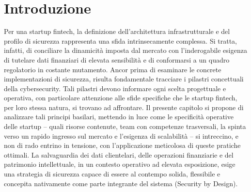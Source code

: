 \section{Introduzione}
Per una startup fintech, la definizione dell'architettura infrastrutturale e del profilo di sicurezza rappresenta una sfida intrinsecamente complessa. Si tratta, infatti, di conciliare la dinamicità imposta dal mercato con l'inderogabile esigenza di tutelare dati finanziari di elevata sensibilità e di conformarsi a un quadro regolatorio in costante mutamento. Ancor prima di esaminare le concrete implementazioni di sicurezza, risulta fondamentale tracciare i pilastri concettuali della cybersecurity. Tali pilastri devono informare ogni scelta progettuale e operativa, con particolare attenzione alle sfide specifiche che le startup fintech, per loro stessa natura, si trovano ad affrontare. Il presente capitolo si propone di analizzare tali principi basilari, mettendo in luce come le specificità operative delle startup – quali risorse contenute, team con competenze trasversali, la spinta verso un rapido ingresso sul mercato e l'esigenza di scalabilità – si intreccino, e non di rado entrino in tensione, con l'applicazione meticolosa di queste pratiche ottimali. La salvaguardia dei dati clientelari, delle operazioni finanziarie e del patrimonio intellettuale, in un contesto operativo ad elevata esposizione, esige una strategia di sicurezza capace di essere al contempo solida, flessibile e concepita nativamente come parte integrante del sistema (Security by Design).
